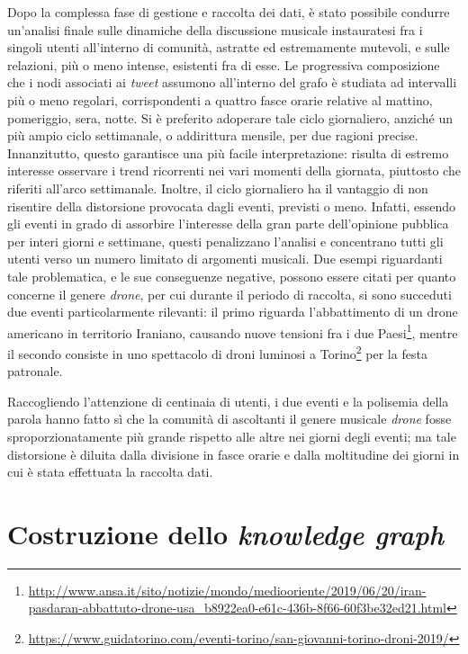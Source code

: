 \documentclass[12pt, a4paper, twocolumn]{article} %
\begin{document}
Dopo la complessa fase di gestione e raccolta dei dati, è stato possibile condurre un'analisi finale sulle dinamiche della discussione musicale instauratesi fra i singoli utenti all'interno di comunità, astratte ed estremamente mutevoli, e sulle relazioni, più o meno intense, esistenti fra di esse.
Le progressiva composizione che i nodi associati ai \textit{tweet} assumono all'interno del grafo è studiata ad intervalli più o meno regolari, corrispondenti a quattro fasce orarie relative al mattino, pomeriggio, sera, notte.
Si è preferito adoperare tale ciclo giornaliero, anziché un più ampio ciclo settimanale, o addirittura mensile, per due ragioni precise.
Innanzitutto, questo garantisce una più facile interpretazione: risulta di estremo interesse osservare i trend ricorrenti nei vari momenti della giornata, piuttosto che riferiti all'arco settimanale.
Inoltre, il ciclo giornaliero ha il vantaggio di non risentire della distorsione provocata dagli eventi, previsti o meno.
Infatti, essendo gli eventi in grado di assorbire l'interesse della gran parte dell'opinione pubblica per interi giorni e settimane, questi penalizzano l'analisi e concentrano tutti gli utenti verso un numero limitato di argomenti musicali.
Due esempi riguardanti tale problematica, e le sue conseguenze negative, possono essere citati per quanto concerne il genere \textit{drone}, per cui durante il periodo di raccolta, si sono succeduti due eventi particolarmente rilevanti: il primo riguarda l'abbattimento di un drone americano in territorio Iraniano, causando nuove tensioni fra i due Paesi\footnote{\url{http://www.ansa.it/sito/notizie/mondo/mediooriente/2019/06/20/iran-pasdaran-abbattuto-drone-usa_b8922ea0-e61c-436b-8f66-60f3be32ed21.html}}, mentre il secondo consiste in uno spettacolo di droni luminosi a Torino\footnote{\url{https://www.guidatorino.com/eventi-torino/san-giovanni-torino-droni-2019/}} per la festa patronale.

Raccogliendo l'attenzione di centinaia di utenti, i due eventi e la polisemia della parola hanno fatto sì che la comunità di ascoltanti il genere musicale \textit{drone} fosse sproporzionatamente più grande rispetto alle altre nei giorni degli eventi; ma tale distorsione è diluita dalla divisione in fasce orarie e dalla moltitudine dei giorni in cui è stata effettuata la raccolta dati.
\hfill
\newpage


\part{Costruzione dello \textit{knowledge graph}}
\end{document}
